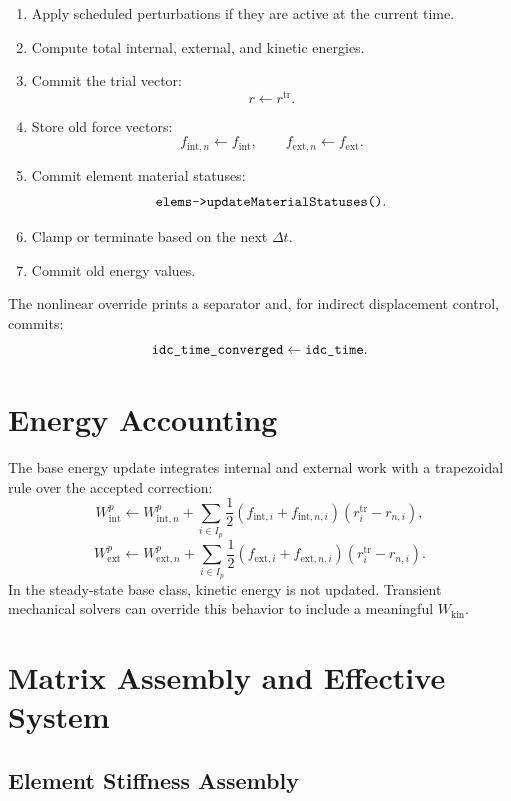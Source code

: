\documentclass[11pt,a4paper]{article}
\newcommand{\code}[1]{\ifmmode\text{\texttt{\detokenize{#1}}}\else\nolinkurl{#1}\fi}
\begin{document}
\begin{enumerate}[leftmargin=2em]
  \item Apply scheduled perturbations if they are active at the current time.
  \item Compute total internal, external, and kinetic energies.
  \item Commit the trial vector:
        \[
          r \leftarrow r^{\mathrm{tr}}.
        \]
  \item Store old force vectors:
        \[
          f_{\mathrm{int},n} \leftarrow f_{\mathrm{int}},\qquad
          f_{\mathrm{ext},n} \leftarrow f_{\mathrm{ext}}.
        \]
  \item Commit element material statuses:
        \[
          \code{elems->updateMaterialStatuses()}.
        \]
  \item Clamp or terminate based on the next \(\Delta t\).
  \item Commit old energy values.
\end{enumerate}

The nonlinear override prints a separator and, for indirect displacement
control, commits:
\[
  \code{idc_time_converged} \leftarrow \code{idc_time}.
\]

\section{Energy Accounting}

The base energy update integrates internal and external work with a trapezoidal
rule over the accepted correction:
\[
  W_{\mathrm{int}}^p
  \leftarrow
  W_{\mathrm{int},n}^p
  +
  \sum_{i\in I_p}
  \frac{1}{2}
  \left(f_{\mathrm{int},i} + f_{\mathrm{int},n,i}\right)
  \left(r_i^{\mathrm{tr}} - r_{n,i}\right),
\]
\[
  W_{\mathrm{ext}}^p
  \leftarrow
  W_{\mathrm{ext},n}^p
  +
  \sum_{i\in I_p}
  \frac{1}{2}
  \left(f_{\mathrm{ext},i} + f_{\mathrm{ext},n,i}\right)
  \left(r_i^{\mathrm{tr}} - r_{n,i}\right).
\]
In the steady-state base class, kinetic energy is not updated.  Transient
mechanical solvers can override this behavior to include a meaningful
\(W_{\mathrm{kin}}\).

\section{Matrix Assembly and Effective System}

\subsection{Element Stiffness Assembly}
\end{document}
